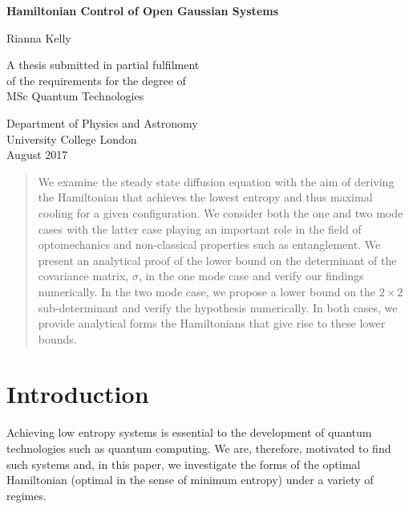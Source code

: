\documentclass[11pt,a4paper]{article}
\numberwithin{equation}{section}
\begin{document}
	\begin{titlepage}
		\begin{center}
			\vspace*{1cm}
			
			\textbf{\LARGE{Hamiltonian Control of Open Gaussian Systems}}
			
			\vspace{1.5cm}			
			\large{Rianna Kelly}
			
			\vfill
			
			A thesis submitted in partial fulfilment\\
			of the requirements for the degree of\\
			MSc Quantum Technologies
			
			\vspace{1cm}
			
			Department of Physics and Astronomy\\
			University College London\\
			August 2017
			
			\vspace{0.3\textheight}
			
			
		\end{center}
	\end{titlepage}

	\begin{abstract}
		
	We examine the steady state diffusion equation with the aim of deriving the Hamiltonian that achieves the lowest entropy and thus maximal cooling for a given configuration. We consider both the one and two mode cases with the latter case playing an important role in the field of optomechanics and non-classical properties such as entanglement. We present an analytical proof of the lower bound on the determinant of the covariance matrix, $\sigma$, in the one mode case and verify our findings numerically. In the two mode case, we propose a lower bound on the $2 \times 2$ sub-determinant and verify the hypothesis numerically. In both cases, we provide analytical forms the Hamiltonians that give rise to these lower bounds. 
	
	\end{abstract}
		
	\tableofcontents
	\listoffigures

	\newpage
		
	\section{Introduction}
	\label{sec:intro}
	Achieving low entropy systems is essential to the development of quantum technologies such as quantum computing. We are, therefore, motivated to find such systems and, in this paper, we investigate the forms of the optimal Hamiltonian (optimal in the sense of minimum entropy) under a variety of regimes.
	
\end{document}
